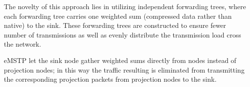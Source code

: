 The novelty of this approach lies in utilizing independent forwarding trees, where each forwarding tree carries one weighted sum (compressed data rather than native) to the sink. These forwarding trees are constructed to ensure fewer number of transmissions as well as evenly distribute the transmission load cross the network.

eMSTP let the sink node gather weighted sums directly from nodes instead of projection nodes; in this way the traffic resulting is eliminated from transmitting the corresponding projection packets from projection nodes to the sink. 

